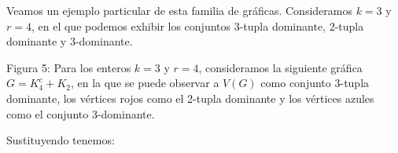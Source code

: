 \documentclass{article}
\begin{document}
Veamos un ejemplo particular de esta familia de gráficas. Consideramos $k=3$ y $r=4$, en el que podemos exhibir los conjuntos 3-tupla dominante, 2-tupla dominante y 3-dominante. 

\begin{center}
    
    \vspace{0.5cm}

    Figura 5: \small{Para los enteros $k=3$ y $r=4$, consideramos la siguiente gráfica $G= K^{c}_{4} + K_{2}$, en la que se puede observar a $V(G)$ como conjunto 3-tupla dominante, los vértices rojos como el 2-tupla dominante y los vértices azules como el conjunto 3-dominante.}
\end{center}

Sustituyendo tenemos:
    
\end{document}
